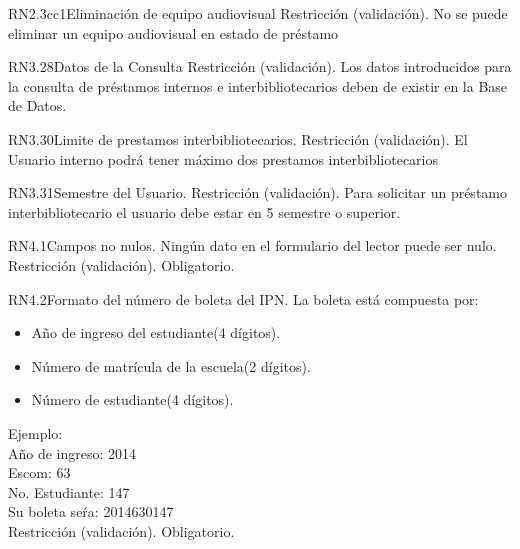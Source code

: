 \begin{BussinesRule}{RN2.3cc1}{Eliminación de equipo audiovisual} 
	\BRitem[Tipo:] Restricción (validación).
	\BRitem[Descripción:] No se puede eliminar un equipo audiovisual en estado de préstamo
\end{BussinesRule}



\begin{BussinesRule}{RN3.28}{Datos de la Consulta} 
	\BRitem[Tipo:] Restricción (validación).
	\BRitem[Descripción:]Los datos introducidos para la consulta de préstamos internos e interbibliotecarios deben de existir en la Base de Datos.
\end{BussinesRule}

\begin{BussinesRule}{RN3.30}{Limite de prestamos interbibliotecarios.} 
	\BRitem[Tipo:] Restricción (validación).
	\BRitem[Descripción:]El Usuario interno podrá tener máximo dos prestamos interbibliotecarios
\end{BussinesRule}

\begin{BussinesRule}{RN3.31}{Semestre del Usuario.} 
	\BRitem[Tipo:] Restricción (validación).
	\BRitem[Descripción:]Para solicitar un préstamo interbibliotecario el usuario debe estar en 5 semestre o superior.
\end{BussinesRule}


\begin{BussinesRule}{RN4.1}{Campos no nulos.} 
	\BRitem[Descripción:] Ningún dato en el formulario del lector puede ser nulo.
	\BRitem[Tipo:] Restricción (validación).
	\BRitem[Nivel:] Obligatorio.
\end{BussinesRule}


\begin{BussinesRule}{RN4.2}{Formato del número de boleta del IPN.}
	\BRitem[Descripción:] La boleta está compuesta por:
		\begin{itemize} 
			\item Año de ingreso del estudiante(4 dígitos).
			\item Número de matrícula de la escuela(2 dígitos).
			\item Número de estudiante(4 dígitos).
		\end{itemize}
	Ejemplo:\\
		Año de ingreso: 2014\\
		Escom: 63\\
		No. Estudiante: 147\\
		Su boleta seŕa: 2014630147\\
	\BRitem[Tipo:] Restricción (validación).
	\BRitem[Nivel:] Obligatorio.
\end{BussinesRule}

